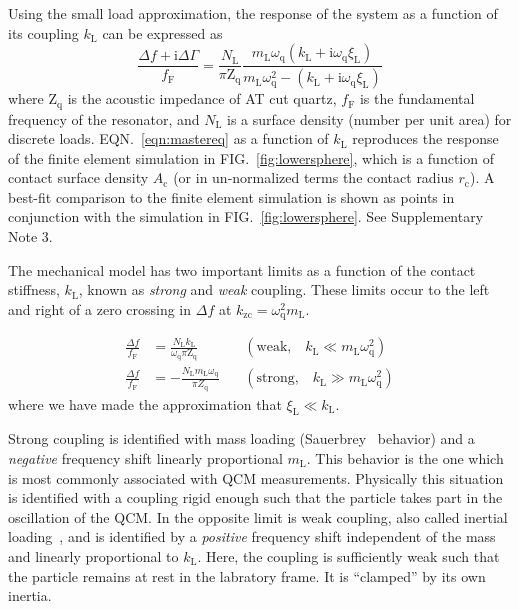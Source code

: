 \documentclass[floatfix,superscriptaddress,a4paper,twocolumn]{revtex4-1}
\newcommand{\Figure}[1]{FIG.~\ref{#1}}
\newcommand{\Equation}[1]{EQN.~\ref{#1}}
\newcommand{\mi}{{\mathrm{i}}}
\newcommand{\df}{\Delta\!f}
\newcommand{\dg}{\Delta\Gamma}
\newcommand{\xil}{\xi_\mathrm{L}}
\newcommand{\kl}{k_\mathrm{L}}
\newcommand{\ml}{m_\mathrm{L}}
\newcommand{\omegaq}{\omega_\mathrm{q}}
\begin{document}
Using the small load approximation, the response of the system as a
function of its coupling $\kl$ can be expressed
as~\cite{steinem2007piezoelectric}
\begin{equation}
\frac{\df + \mi \dg}{f_\mathrm{F}} = \frac{N_\mathrm{L}}{\pi
\mathrm{Z}_\mathrm{q}}
\frac{\ml \omegaq \left( \kl + \mi
\omegaq \xil\right) }
{\ml \omegaq^2 - \left(\kl + \mi
\omegaq \xil\right)}
\label{eqn:mastereq}
\end{equation}
where $\mathrm{Z}_\mathrm{q}$ is the acoustic impedance of AT cut quartz,
$f_\mathrm{F}$ is the fundamental frequency of the resonator, and
$N_\mathrm{L}$ is a surface density (number per unit area) for discrete
loads.  \Equation{eqn:mastereq} as a function of $\kl$ reproduces the
response of the finite element simulation in \Figure{fig:lowersphere},
which is a function of contact surface density $A_\mathrm{c}$ (or in
un-normalized terms the contact radius $r_\mathrm{c}$).  A best-fit comparison to
the finite element simulation is shown as points in conjunction with the simulation
in \Figure{fig:lowersphere}.  See Supplementary Note 3.

The mechanical model has two important limits as a function of the contact
stiffness, $\kl$, known as \textit{strong} and \textit{weak}
coupling.  These limits occur to the left and right of a zero crossing in $\df$ at
$k_\mathrm{zc}=\omegaq^2 \ml$.

\vspace{-\baselineskip}
\vspace{-\parskip}
\begin{align}
\frac{\df}{f_\mathrm{F}}&=
\frac{N_\mathrm{L} \kl}
{\omegaq\pi \mathrm{Z}_\mathrm{q}}
&\,&\left(\text{weak,}\quad \kl\ll \ml
\omegaq^2\right)
\label{eqn:couplinguy1}
\\
\frac{\df}{f_\mathrm{F}}&=  -\frac{N_\mathrm{L}
\ml \omegaq}{\pi Z_\mathrm{q}}
&\,&\left(\text{strong,}\quad \kl\gg \ml
\omegaq^2\right)
\label{eqn:couplinguy2}
\end{align}
where we have made the approximation that
$\xil\ll\kl$.~\cite{steinem2007piezoelectric}


Strong coupling is identified with mass loading
(Sauerbrey~\cite{sauerbrey1959verwendung} behavior) and a \textit{negative}
frequency shift linearly proportional $\ml$.  This behavior is the
one which is most commonly associated with QCM measurements.  Physically
this situation is identified with a coupling rigid enough such that
the particle takes part in the oscillation of the QCM.
In the
opposite limit is weak coupling, also called inertial
loading~\cite{dybwad1985sensitive}, and is identified by a \textit{positive}
frequency shift independent of the mass and linearly proportional
to $\kl$.  Here, the coupling is sufficiently weak such that the particle
remains at rest in the labratory frame.  It is ``clamped'' by its own
inertia.~\cite{du2008role}
\end{document}
